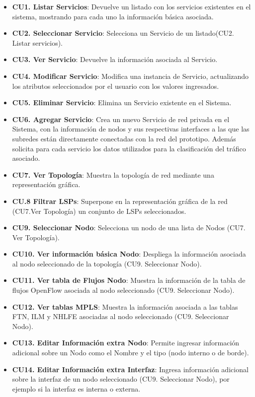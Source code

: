 \begin{itemize}
\item \textbf{CU1. Listar Servicios}: Devuelve un listado con los servicios existentes en el sistema, mostrando para cada uno la informaci\'on b\'asica asociada.

\item \textbf{CU2. Seleccionar Servicio}: Selecciona un Servicio de un listado(CU2. Listar servicios).

\item \textbf{CU3. Ver Servicio}: Devuelve la informaci\'on asociada al Servicio.

\item \textbf{CU4. Modificar Servicio}: Modifica una instancia de Servicio, actualizando los atributos seleccionados por el usuario con los valores ingresados.
 								
\item \textbf{CU5. Eliminar Servicio}: Elimina un Servicio existente en el Sistema.

\item \textbf{CU6. Agregar Servicio}: Crea un nuevo Servicio de red privada en el Sistema, con la informaci\'on de nodos y sus respectivas interfaces a las que las subredes est\'an directamente conectadas con la red del prototipo. Adem\'as solicita para cada servicio los datos utilizados para la clasificaci\'on del tr\'afico asociado. 

\item \textbf{CU7. Ver Topolog\'ia}: Muestra la topolog\'ia de red mediante una representaci\'on gr\'afica.

\item \textbf{CU.8 Filtrar LSPs}: Superpone en la representaci\'on gr\'afica de la red (CU7.Ver Topolog\'ia) un conjunto de LSPs seleccionados.

\item \textbf{CU9. Seleccionar Nodo}: Selecciona un nodo de una lista de Nodos (CU7. Ver Topolog\'ia).

\item \textbf{CU10. Ver informaci\'on b\'asica Nodo}: Despliega la informaci\'on asociada al nodo seleccionado de la topolog\'ia (CU9. Seleccionar Nodo).

\item \textbf{CU11. Ver tabla de Flujos Nodo}: Muestra la informaci\'on de la tabla de flujos OpenFlow asociada al nodo seleccionado (CU9. Seleccionar Nodo).

\item \textbf{CU12. Ver tablas MPLS}: Muestra la informaci\'on asociada a las tablas FTN, ILM y NHLFE asociadas al nodo seleccionado (CU9. Seleccionar Nodo).

\item \textbf{CU13. Editar Informaci\'on extra Nodo}: Permite ingresar informaci\'on adicional sobre un Nodo como el Nombre y el tipo (nodo interno o de borde).

\item \textbf{CU14. Editar Informaci\'on extra Interfaz}: Ingresa informaci\'on adicional sobre la interfaz de un nodo seleccionado (CU9. Seleccionar Nodo), por ejemplo si la interfaz es interna o externa.
\end{itemize}

